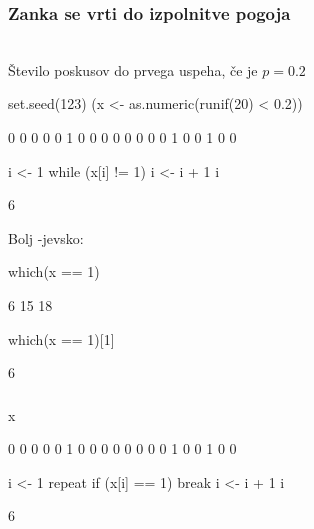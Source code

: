 \begin{frame}[fragile]
\frametitle{Zanka se vrti do izpolnitve pogoja}
\\
Število poskusov do prvega uspeha, če je $p=0.2$
\begin{Schunk}
\begin{Sinput}
 set.seed(123)
 (x <- as.numeric(runif(20) < 0.2))
\end{Sinput}
\begin{Soutput}
 [1] 0 0 0 0 0 1 0 0 0 0 0 0 0 0 1 0 0 1 0 0
\end{Soutput}
\begin{Sinput}
 i <- 1
 while (x[i] != 1) {
     i <- i + 1
 }
 i
\end{Sinput}
\begin{Soutput}
[1] 6
\end{Soutput}
\end{Schunk}

Bolj \R-jevsko:\vspace{-0.5cm}
\begin{Schunk}
\begin{Sinput}
 which(x == 1)
\end{Sinput}
\begin{Soutput}
[1]  6 15 18
\end{Soutput}
\begin{Sinput}
 which(x == 1)[1]
\end{Sinput}
\begin{Soutput}
[1] 6
\end{Soutput}
\end{Schunk}
\end{frame}

\begin{frame}[fragile]
\frametitle{}
\begin{Schunk}
\begin{Sinput}
 x
\end{Sinput}
\begin{Soutput}
 [1] 0 0 0 0 0 1 0 0 0 0 0 0 0 0 1 0 0 1 0 0
\end{Soutput}
\begin{Sinput}
 i <- 1
 repeat {
     if (x[i] == 1) 
         break
     i <- i + 1
 }
 i
\end{Sinput}
\begin{Soutput}
[1] 6
\end{Soutput}
\end{Schunk}
\end{frame}

